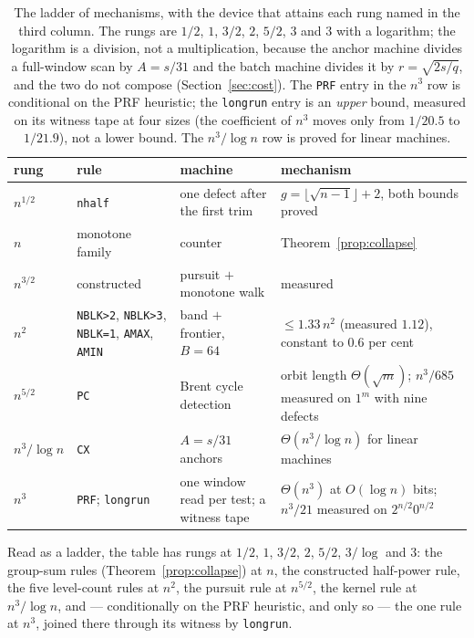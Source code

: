 \documentclass[11pt]{article}
\theoremstyle{remark}
\begin{document}
\begin{table}[h]
\centering
\small
\begin{tabular}{@{}llll@{}}
\toprule
rung & rule & machine & mechanism \\
\midrule
$n^{1/2}$ & \texttt{nhalf} & one defect after the first trim & $g=\lfloor\sqrt{n-1}\rfloor+2$, both bounds proved \\
$n$ & monotone family & counter & Theorem~\ref{prop:collapse} \\
$n^{3/2}$ & constructed & pursuit $+$ monotone walk & measured \\
$n^{2}$ & \texttt{NBLK>2}, \texttt{NBLK>3}, \texttt{NBLK=1}, \texttt{AMAX}, \texttt{AMIN} & band $+$ frontier, $B=64$ & $\le1.33\,n^{2}$ (measured $1.12$), constant to $0.6$ per cent \\
$n^{5/2}$ & \texttt{PC} & Brent cycle detection & orbit length $\Theta(\sqrt{m})$; $n^{3}/685$ measured on $1^{m}$ with nine defects \\
$n^{3}/\log n$ & \texttt{CX} & $A=s/31$ anchors & $\Theta(n^{3}/\log n)$ for linear machines \\
$n^{3}$ & \texttt{PRF}; \texttt{longrun} & one window read per test; a witness tape & $\Theta(n^{3})$ at $O(\log n)$ bits; $n^{3}/21$ measured on $2^{n/2}0^{n/2}$ \\
\bottomrule
\end{tabular}
\caption{The ladder of mechanisms, with the device that attains each rung named in the third
column. The rungs are $1/2$, $1$, $3/2$, $2$, $5/2$, $3$ and $3$ with a
logarithm; the logarithm is a division, not a multiplication, because the anchor machine divides a
full-window scan by $A=s/31$ and the batch machine divides it by $r=\sqrt{2s/q}$, and the two do not
compose (Section~\ref{sec:cost}). The \texttt{PRF} entry in the $n^{3}$ row is conditional on the PRF
heuristic; the \texttt{longrun} entry is an \emph{upper} bound, measured on its witness tape at four
sizes (the coefficient of $n^{3}$ moves only from $1/20.5$ to $1/21.9$), not a lower bound. The
$n^{3}/\log n$ row is proved for linear machines.}
\end{table}

Read as a ladder, the table has rungs at $1/2$, $1$, $3/2$, $2$, $5/2$, $3/\log$ and $3$: the
group-sum rules (Theorem~\ref{prop:collapse}) at $n$, the constructed half-power rule, the five
level-count rules at $n^{2}$, the pursuit rule at $n^{5/2}$, the kernel rule at $n^{3}/\log n$, and
--- conditionally on the PRF heuristic, and only so --- the one rule at $n^{3}$, joined there through
its witness by \texttt{longrun}.
\end{document}
